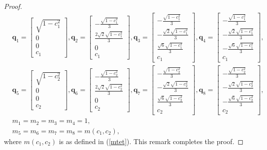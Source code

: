 \documentclass[12pt]{amsart}
\theoremstyle{definition}
\newcommand {\q} {\mathbf{q}}
\begin{document}
{\begin{proof}
\begin{align*}
&\q_1=\begin{bmatrix}\sqrt{1-c_1^2} \\ 0 \\ 0 \\ c_1\end{bmatrix}, \q_2=\begin{bmatrix}-\frac{\sqrt{1-c_1^2}}{3} \\ \frac{2\sqrt{2}\sqrt{1-c_1^2}}{3} \\ 0 \\ c_1\end{bmatrix}, \q_3=\begin{bmatrix}-\frac{\sqrt{1-c_1^2}}{3}\\-\frac{\sqrt{2}\sqrt{1-c_1^2}}{3}\\ \frac{\sqrt{6}\sqrt{1-c_1^2}}{3}\\c_1\end{bmatrix}, \q_4=\begin{bmatrix} -\frac{\sqrt{1-c_1^2}}{3}\\-\frac{\sqrt{2}\sqrt{1-c_1^2}}{3}\\-\frac{\sqrt{6}\sqrt{1-c_1^2}}{3}\\c_1\end{bmatrix},\\
&\q_5=\begin{bmatrix}\sqrt{1-c_2^2} \\ 0 \\ 0 \\ c_2\end{bmatrix}, \q_6=\begin{bmatrix}-\frac{\sqrt{1-c_2^2}}{3} \\ \frac{2\sqrt{2}\sqrt{1-c_2^2}}{3} \\ 0 \\ c_2\end{bmatrix}, \q_7=\begin{bmatrix}-\frac{\sqrt{1-c_2^2}}{3}\\-\frac{\sqrt{2}\sqrt{1-c_2^2}}{3}\\ \frac{\sqrt{6}\sqrt{1-c_2^2}}{3}\\c_2\end{bmatrix}, \q_8=\begin{bmatrix} -\frac{\sqrt{1-c_2^2}}{3}\\-\frac{\sqrt{2}\sqrt{1-c_2^2}}{3}\\-\frac{\sqrt{6}\sqrt{1-c_2^2}}{3}\\c_2\end{bmatrix},\\
&m_1=m_2=m_3=m_4=1,\\
&m_5=m_6=m_7=m_8=m(c_1,c_2),\end{align*}
where $m(c_1,c_2)$ is as defined in (\ref{mtet}).
This remark completes the proof.
\end{proof}
\bigskip

}
\end{document}
